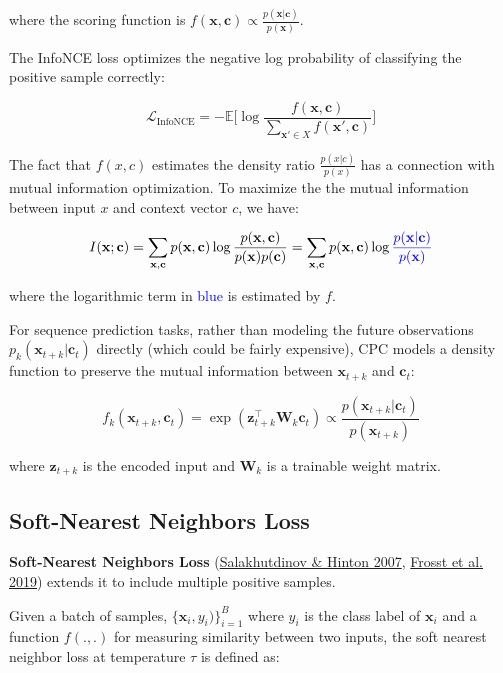 \documentclass[12pt]{article}
\begin{document}
where the scoring function is $f(\mathbf{x}, \mathbf{c}) \propto \frac{p(\mathbf{x}\vert\mathbf{c})}{p(\mathbf{x})}$.

The InfoNCE loss optimizes the negative log probability of classifying the positive sample correctly:

\[
\mathcal{L}_\text{InfoNCE} = - \mathbb{E} \Big[\log \frac{f(\mathbf{x}, \mathbf{c})}{\sum_{\mathbf{x}' \in X} f(\mathbf{x}', \mathbf{c})} \Big]
\]

The fact that $f(x, c)$ estimates the density ratio $\frac{p(x\vert c)}{p(x)}$ has a connection with mutual information optimization. To maximize the the mutual information between input $x$ and context vector $c$, we have:

\[
I(\mathbf{x}; \mathbf{c}) = \sum_{\mathbf{x}, \mathbf{c}} p(\mathbf{x}, \mathbf{c}) \log\frac{p(\mathbf{x}, \mathbf{c})}{p(\mathbf{x})p(\mathbf{c})} = \sum_{\mathbf{x}, \mathbf{c}} p(\mathbf{x}, \mathbf{c})\log\textcolor{blue}{\frac{p(\mathbf{x}|\mathbf{c})}{p(\mathbf{x})}}
\]

where the logarithmic term in \textcolor{blue}{blue} is estimated by $f$.

For sequence prediction tasks, rather than modeling the future observations $p_k(\mathbf{x}_{t+k} \vert \mathbf{c}_t)$ directly (which could be fairly expensive), CPC models a density function to preserve the mutual information between $\mathbf{x}_{t+k}$ and $\mathbf{c}_t$:

\[
f_k(\mathbf{x}_{t+k}, \mathbf{c}_t) = \exp(\mathbf{z}_{t+k}^\top \mathbf{W}_k \mathbf{c}_t) \propto \frac{p(\mathbf{x}_{t+k}\vert\mathbf{c}_t)}{p(\mathbf{x}_{t+k})}
\]

where $\mathbf{z}_{t+k}$ is the encoded input and $\mathbf{W}_k$ is a trainable weight matrix.

\subsection{Soft-Nearest Neighbors Loss}

\textbf{Soft-Nearest Neighbors Loss} (\href{http://proceedings.mlr.press/v2/salakhutdinov07a.html}{Salakhutdinov \& Hinton 2007}, \href{https://arxiv.org/abs/1902.01889}{Frosst et al. 2019}) extends it to include multiple positive samples.

Given a batch of samples, $\{\mathbf{x}_i, y_i)\}^B_{i=1}$ where $y_i$ is the class label of $\mathbf{x}_i$ and a function $f(.,.)$ for measuring similarity between two inputs, the soft nearest neighbor loss at temperature $\tau$ is defined as:
\end{document}

